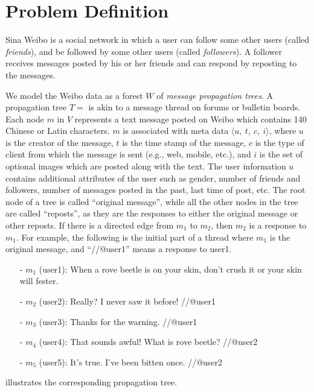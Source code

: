 \section{Problem Definition}
\label{sec:prob}
Sina Weibo is a social network
in which a user can follow some other users (called {\em friends}),
and be followed by some other users (called {\em followers}).
A follower receives messages posted by his or her friends and can
respond by reposting to the messages.

We model the Weibo data as a forest $W$ of {\em message propagation trees}.
A propagation tree $T =$ 
is akin to a message thread on forums or bulletin
boards.
Each node $m$ in $V$ represents a text message posted on Weibo which
contains 140 Chinese or Latin characters. $m$ is associated with
meta data $\langle u,~ t,~ c,~i \rangle$,
where $u$ is the creator of the message,
$t$ is the time stamp of the message, $c$ is the type of client from which
the message is sent (e.g., web, mobile, etc.), and $i$ is the set of optional
images which are posted along with the text.
The user information $u$ contains additional
attributes of the user such as gender, number of friends and followers,
number of messages posted in the past, last time of post, etc.
The root node of a tree
is called ``original message'', while all the other nodes in the tree are
called ``reposts'', as they are the responses to either the original message
or other reposts. If there is a directed edge from $m_1$ to $m_2$, then
$m_2$ is a response to $m_1$. For example, the following is the initial
part of a thread where $m_1$ is the original message, and
``//@user1'' means a response to user1.
\begin{itemize}
\small
\item[-] $m_1$ (user1): When a rove beetle is on your skin,
don't crush it or your skin will fester.
\item[-] $m_2$ (user2): Really? I never saw it before! //@user1
\item[-] $m_3$ (user3): Thanks for the warning. //@user1
\item[-] $m_4$ (user4): That sounds awful! What is rove beetle? //@user2
\item[-] $m_5$ (user5): It's true. I've been bitten once. //@user2
\end{itemize}
 illustrates the corresponding propagation tree.

